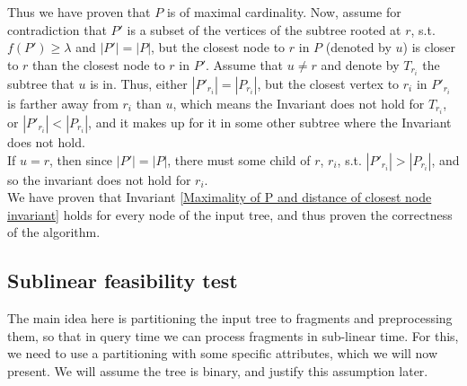 \documentclass[11pt,a4paper]{article}
\theoremstyle{definition}
\theoremstyle{remark}
\begin{document}
Thus we have proven that $P$ is of maximal cardinality. Now, assume for contradiction that $P'$ is a subset of the vertices of the subtree rooted at $r$, s.t. $f(P')\geq\lambda$ and $|P'| = |P|$, but the closest node to $r$ in $P$ (denoted by $u$) is closer to $r$ than the closest node to $r$ in $P'$. Assume that $u \neq r$ and denote by $T_{r_i}$ the subtree that $u$ is in. Thus, either $|P'_{r_i}| = |P_{r_i}|$, but the closest vertex to $r_i$ in $P'_{r_i}$ is farther away from $r_i$ than $u$, which means the Invariant does not hold for $T_{r_i}$, or $|P'_{r_i}| < |P_{r_i}|$, and it makes up for it in some other subtree where the Invariant does not hold.\\
If $u=r$, then since $|P'| = |P|$, there must some child of $r$, $r_i$, s.t. $|P'_{r_i}| > |P_{r_i}|$, and so the invariant does not hold for $r_i$.\\
We have proven that Invariant \ref{Maximality of P and distance of closest node invariant} holds for every node of the input tree, and thus proven the correctness of the algorithm.


\subsection{Sublinear feasibility test}
The main idea here is partitioning the input tree to fragments and preprocessing them, so that in query time we can process fragments in sub-linear time. For this, we need to use a partitioning with some specific attributes, which we will now present. We will assume the tree is binary, and justify this assumption later.
\end{document}
